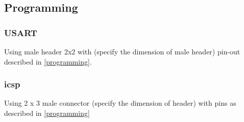 \subsection{Programming}
	\subsubsection{USART}
		 Using male header 2x2 with (specify the dimension of male header) pin-out described in \ref{programming}.
		
	\subsubsection{\gls{icsp}}
		Using 2 x 3 male connector (specify the dimension of header) with pins as described in \ref{programming}
